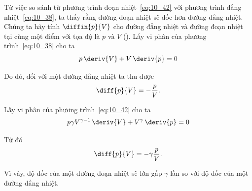 
Từ việc so sánh từ phương trình đoạn nhiệt~\eqref{eq:10_42} với phương trình đẳng nhiệt~\eqref{eq:10_38}, ta thấy rằng đường đoạn nhiệt sẽ dốc hơn đường đẳng nhiệt. Chúng ta hãy tính $\diffin{p}{V}$ cho đường đẳng nhiệt và đường đoạn nhiệt tại cùng một điểm với tọa độ là $p$ và $V$ (). Lấy vi phân của phương trình~\eqref{eq:10_38} cho ta
\begin{equation*}
	p\,\deriv{V} + V\,\deriv{p} = 0
\end{equation*}

\noindent

Do đó, đối với một đường đẳng nhiệt ta thu được
\begin{equation}\label{eq:10_43}
	\diff{p}{V} = -\frac{p}{V}.
\end{equation}

\noindent

Lấy vi phân của phương trình~\eqref{eq:10_42} cho ta 
\begin{equation*}
	p \gamma V^{\gamma - 1}\,\deriv{V} + V^{\gamma}\,\deriv{p} = 0
\end{equation*}

\noindent

Từ đó
\begin{equation*}
	\diff{p}{V} = -\gamma \frac{p}{V}.
\end{equation*}

\noindent

Vì vây, độ dốc của một đường đoạn nhiệt sẽ lớn gấp $\gamma$ lần so với độ dốc của một đường đẳng nhiệt. 


